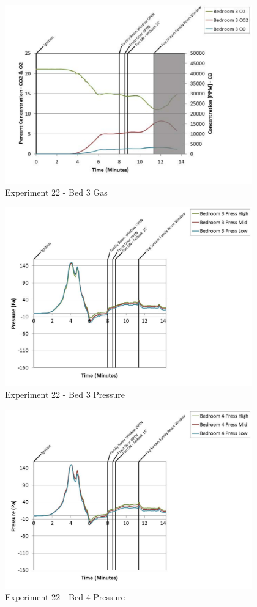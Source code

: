 \documentclass{article}
\begin{document}
\begin{appendices}
	\clearpage

	\begin{figure}[h!]
		\centering
		\includegraphics[height=3.05in]{0_Images/Results_Charts/Exp_22_Charts/Bed3Gas.pdf}
		\caption{Experiment 22 - Bed 3 Gas}
	\end{figure}
 

	\begin{figure}[h!]
		\centering
		\includegraphics[height=3.05in]{0_Images/Results_Charts/Exp_22_Charts/Bed3Pressure.pdf}
		\caption{Experiment 22 - Bed 3 Pressure}
	\end{figure}
 
	\clearpage

	\begin{figure}[h!]
		\centering
		\includegraphics[height=3.05in]{0_Images/Results_Charts/Exp_22_Charts/Bed4Pressure.pdf}
		\caption{Experiment 22 - Bed 4 Pressure}
	\end{figure}
 


\end{appendices}
\end{document}
